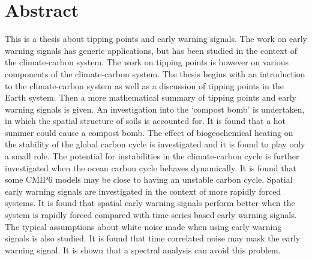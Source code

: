 \chapter{Abstract}

This is a thesis about tipping points and early warning signals. The work on early warning signals has generic applications,
but has been studied in the context of the climate-carbon system. The work on tipping points is however on various components
of the climate-carbon system. The thesis begins with an introduction to the climate-carbon system as well as a discussion of tipping points in the
Earth system. Then a more mathematical summary of tipping points and early warning signals is given. An investigation into
the `compost bomb' is undertaken, in which the spatial structure of soils is accounted for. It is found that a hot summer could cause a compost bomb.
The effect of biogeochemical heating on the stability of the global carbon cycle is investigated and it is found to play only a small role.
The potential for instabilities in the climate-carbon cycle is further investigated when the ocean carbon cycle behaves dynamically. It is found
that some CMIP6 models may be close to having an unstable carbon cycle. Spatial early warning signals are investigated in the context of more rapidly forced
systems. It is found that spatial early warning signals perform better when the system is rapidly forced compared with time series based early warning signals.
The typical assumptions about white noise made when using early warning signals is also studied. It is found that time correlated noise may mask the
early warning signal. It is shown that a spectral analysis can avoid this problem.
